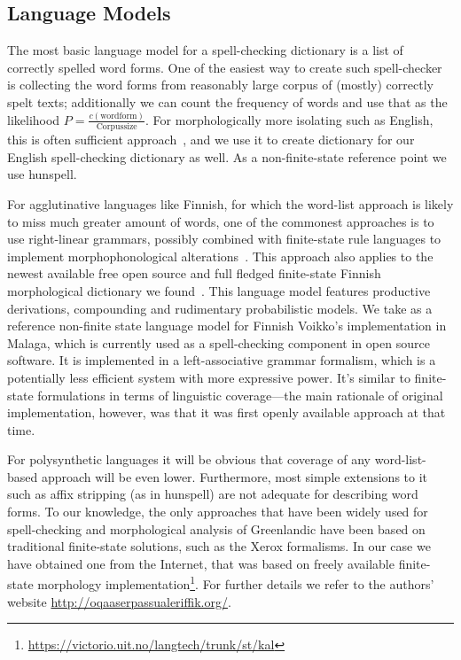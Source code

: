 \documentclass[11pt]{article}
\begin{document}
\subsection{Language Models}
\label{subsec:language-models}

The most basic language model for a spell-checking dictionary is a list of
correctly spelled word forms. One of the easiest way to create such 
spell-checker is collecting the word forms from reasonably large corpus of
(mostly) correctly spelt texts; additionally we can count the frequency of words
and use that as the likelihood $P=\frac{c(\mathrm{wordform})}{\mathrm{Corpus size}}$.
For morphologically more isolating such as English, this is often sufficient
approach~\cite{norvig/2010}, and we use it to create dictionary for our English
spell-checking dictionary as well. As a non-finite-state reference point we use
hunspell.

For agglutinative languages like Finnish, for which the word-list approach is
likely to miss much greater amount of words, one of the commonest approaches is
to use right-linear grammars, possibly combined with finite-state rule
languages to implement morphophonological alterations~\cite{koskenniemi/1983}.
This approach also applies to the newest available free open source and full
fledged finite-state Finnish morphological dictionary we
found~\cite{pirinen/2011/nodalida}. This language model features productive
derivations, compounding and rudimentary probabilistic models.  We take as a
reference non-finite state language model for Finnish Voikko's implementation
in Malaga, which is currently used as a spell-checking component in open source
software. It is implemented in a left-associative grammar formalism, which is a
potentially less efficient system with more expressive power. It's similar to
finite-state formulations in terms of linguistic coverage---the main rationale
of original implementation, however, was that it was first openly available
approach at that time.

For polysynthetic languages it will be obvious that coverage of any
word-list-based approach will be even lower. Furthermore, most simple
extensions to it such as affix stripping (as in hunspell) are not adequate for
describing word forms. To our knowledge, the only approaches that have been
widely used for spell-checking and morphological analysis of Greenlandic have
been based on traditional finite-state solutions, such as the Xerox formalisms.
In our case we have obtained one from the Internet, that was based on freely
available finite-state morphology
implementation\footnote{\url{https://victorio.uit.no/langtech/trunk/st/kal}}.
For further details we refer to the authors' website
\url{http://oqaaserpassualeriffik.org/}.
\end{document}
